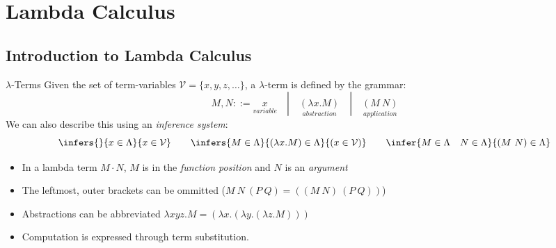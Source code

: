 \chapter{Lambda Calculus}

\section{Introduction to Lambda Calculus}
\begin{definitionbox}{$\lambda$-Terms}
    Given the set of term-variables $\mathcal{V} = \{x,y,z, \dots\}$, a $\lambda$-term is defined by the grammar:
    \[M, N ::= \underset{variable}{x} \quad | \quad \underset{abstraction}{(\lambda x . M)} \quad | \quad \underset{application}{(M \ N)}\]
    We can also describe this using an \textit{inference system}:
    \[\infers{}{x \in \Lambda}{x \in \mathcal{V}} \qquad \infers{M \in \Lambda}{(\lambda x . M) \in \Lambda}{(x \in \mathcal{V})} \qquad \infer{M \in \Lambda \quad N \in \Lambda}{(M \ N) \in \Lambda}\]
    \begin{itemize}
        \item In a lambda term $M \cdot N$, $M$ is in the \textit{function position} and $N$ is an \textit{argument}
        \item The leftmost, outer brackets can be ommitted ($M \ N \ (P \ Q) = ((M \ N) \ (P \ Q))$)
        \item Abstractions can be abbreviated $\lambda x y z . M = (\lambda x . (\lambda y . (\lambda z . M)))$
        \item Computation is expressed through term substitution.
    \end{itemize}
\end{definitionbox}

